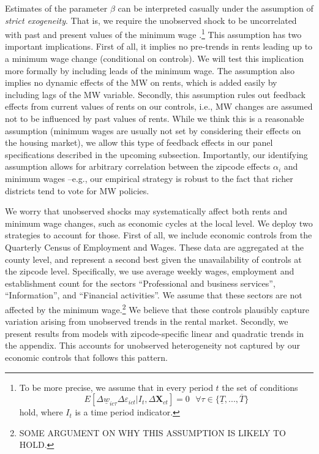 Estimates of the parameter $\beta$ can be interpreted casually under the assumption of
\textit{strict exogeneity}. That is, we require the unobserved shock to be uncorrelated
with past and present values of the minimum wage \parencite[][chapter 10]
{wooldridge2010}.\footnote{To be more precise, we assume that in every period $t$ the set of 
	conditions 
	$$E[\Delta \underline{w}_{ic\tau} \Delta \varepsilon_{ict} | I_t, \Delta \mathbf{X}_{ct}] = 0
	\ \ \ \forall \tau \in \{\underline{T}, ..., \overline{T}\}$$
	hold, where $I_t$ is a time period indicator.}
This assumption has two important implications. First of all, it implies no pre-trends in 
rents leading up to a minimum wage change (conditional on controls). We will test this 
implication more formally by including leads of the minimum wage. The assumption also implies
no dynamic effects of the MW on rents, which is added easily by including lags of the MW 
variable. Secondly, this assumption rules out feedback effects from current values of rents 
on our controls, i.e., MW changes are assumed not to be influenced by past values of rents. 
While we think this is a reasonable assumption (minimum wages are usually not set by considering 
their effects on the housing market), we allow this type of feedback effects in our panel 
specifications described in the upcoming subsection. Importantly, our identifying assumption 
allows for arbitrary correlation between the zipcode effects $\alpha_i$ and minimum wages 
--e.g., our empirical strategy is robust to the fact that richer districts tend to vote for 
MW policies.


We worry that unobserved shocks may systematically affect both rents and minimum wage 
changes, such as economic cycles at the local level. We deploy two strategies to account 
for those. First of all, we include economic controls from the Quarterly Census of 
Employment and Wages. These data are aggregated at the county level, and represent a 
second best given the unavailability of controls at the zipcode level. Specifically, we 
use average weekly wages, employment and establishment count for the sectors 
``Professional and business services'', ``Information'', and ``Financial activities''. 
We assume that these sectors are not affected by the minimum wage.\footnote{SOME ARGUMENT
	ON WHY THIS ASSUMPTION IS LIKELY TO HOLD.}
We believe that these controls plausibly capture variation arising from unobserved trends 
in the rental market. Secondly, we present results from models with zipcode-specific linear 
and quadratic trends in the appendix. This accounts for unobserved heterogeneity not 
captured by our economic controls that follows this pattern.

